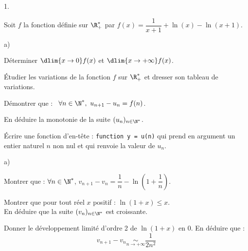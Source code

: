 \documentclass[11pt]{article}%
\begin{document}
\begin{noliste}{1.}
 \setlength{\itemsep}{4mm}
\item Soit $f$ la fonction définie sur $\R_+^*$ par $f(x) =
  \dfrac{1}{x + 1} + \ln(x)-\ln(x + 1)$.
  \begin{noliste}{a)}
    \setlength{\itemsep}{2mm}
  \item Déterminer $ \dlim{x \to 0} f(x)$ et $ \dlim{x \to + \infty}
    f(x)$.

    

  \item Étudier les variations de la fonction $f$ sur $\R_+^*$ et
    dresser son tableau de variations.

    

  \item Démontrer que : \ $\forall n \in \N^*, \ u_{n + 1}-u_{n} =
    f(n)$.

    




  \item En déduire la monotonie de la suite $(u_{n})_{n\in \N^*}$.

    

  \item Écrire une fonction d'en-tête : {\tt function y = u(n)} qui
    prend en argument un entier naturel $n$ non nul et qui renvoie la
    valeur de $u_{n}$.

    
  \end{noliste}




\item 
  \begin{noliste}{a)}
    \setlength{\itemsep}{2mm}
  \item Montrer que : $\forall n \in \N^*$, $v_{n + 1}-v_{n} =
    \dfrac{1}{n} - \ln \left(1 + \dfrac{1}{n} \right)$.

    

  \item Montrer que pour tout réel $x$ positif : $\ln(1 + x) \leq x$.\\
    En déduire que la suite $(v_{n})_{n \in \N^*}$ est croissante.

    

  \item Donner le développement limité d'ordre 2 de $\ln(1 + x)$ en
    $0$. En déduire que :
    \[
    v_{n + 1}-v_{n} \underset{n\to + \infty}{\sim} \frac{1}{2n^{2}}
    \]
  \end{noliste}


\end{noliste}
\end{document}
